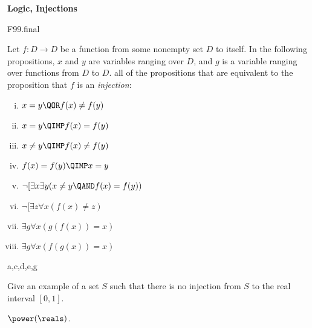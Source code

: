 \examspace
\begin{problem} \textbf{Logic, Injections}
\begin{staffnotes}
F99.final
\end{staffnotes}

\bparts

\ppart Let $f:D \to D$ be a function from some nonempty set $D$ to itself.
In the following propositions, $x$ and $y$ are variables ranging over
$D$, and $g$ is a variable ranging over functions from $D$ to
$D$.   all of the propositions that
are equivalent to the proposition that $f$ is an
\emph{injection}:

\begin{enumerate}[(i)]
\item $x =y \QOR f(x) \neq f(y)$
\item $x =y \QIMP f(x) = f(y)$
\item $x \neq y \QIMP f(x) \neq f(y)$
\item $f(x) =f(y) \QIMP x = y$
\item $\neg[\exists x\exists y(x \neq y \QAND f(x)= f(y))$
\item $\neg[\exists z \forall x(f(x) \neq z)$
\item $\exists g \forall x (g(f(x))=x)$
\item $\exists g \forall x (f(g(x))=x)$
\end{enumerate}

\begin{solution}
a,c,d,e,g
\end{solution}

\ppart Give an example of a set $S$ such that there is no injection
from $S$ to the real interval $[0,1]$.

\begin{solution}
$\power(\reals)$.
\end{solution}

\eparts

\end{problem}

